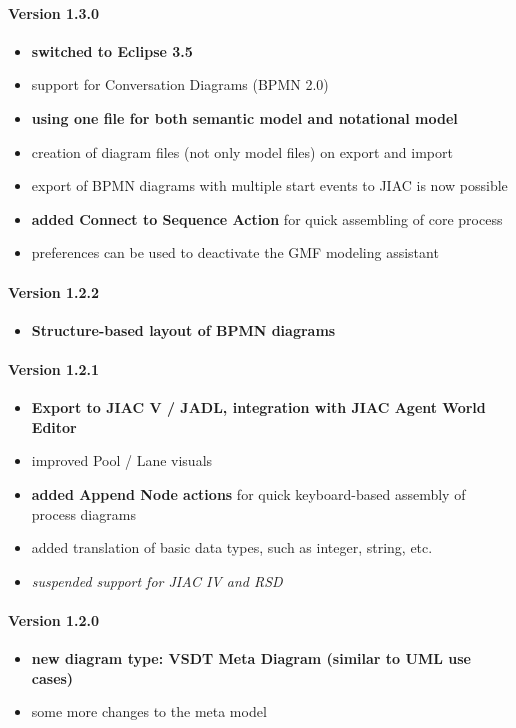 \paragraph{Version 1.3.0}
\begin{itemize}
	\item \textbf{switched to Eclipse 3.5}
	\item support for Conversation Diagrams (BPMN 2.0)
	\item \textbf{using one file for both semantic model and notational model}
	\item creation of diagram files (not only model files) on export and import
	\item export of BPMN diagrams with multiple start events to JIAC is now possible
	\item \textbf{added Connect to Sequence Action} for quick assembling of core process
	\item preferences can be used to deactivate the GMF modeling assistant
\end{itemize}

\paragraph{Version 1.2.2}
\begin{itemize}
	\item \textbf{Structure-based layout of BPMN diagrams}
\end{itemize}

\paragraph{Version 1.2.1}
\begin{itemize}
	\item \textbf{Export to JIAC V / JADL, integration with JIAC Agent World Editor}
	\item improved Pool / Lane visuals
	\item \textbf{added Append Node actions} for quick keyboard-based assembly of process diagrams
	\item added translation of basic data types, such as integer, string, etc.
	\item \textit{suspended support for JIAC IV and RSD}
\end{itemize}

\paragraph{Version 1.2.0}
\begin{itemize}
	\item \textbf{new diagram type: VSDT Meta Diagram (similar to UML use cases)}
	\item some more changes to the meta model
\end{itemize}

